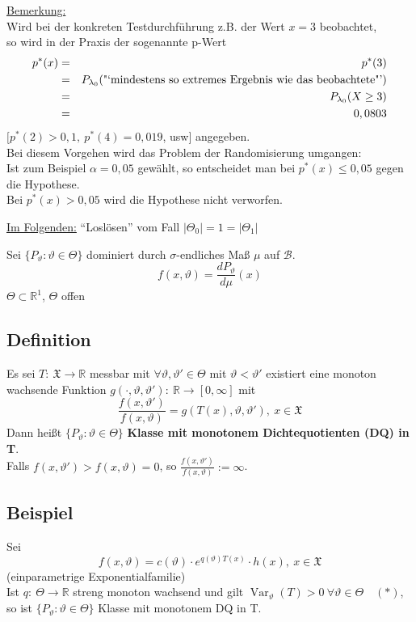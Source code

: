\documentclass[a4paper,11pt,twoside,titlepage]{article}
\newcommand{\R}{{\mathbb R}}
\newcommand{\XX}{{\mathfrak X}} %
\newcommand\BB{ \mathcal{B} } %
\DeclareMathOperator{\var}{Var}
\begin{document}
\underline{Bemerkung:}\\
Wird bei der konkreten Testdurchführung z.B. der Wert $x=3$ beobachtet,\\
so wird in der Praxis der sogenannte p-Wert
\begin{eqnarray*} p^\ast(x)&=&p^\ast(3)\\&=&P_{\lambda_0}(\textnormal{"`mindestens so extremes Ergebnis wie das beobachtete"'})\\&=&P_{\lambda_0}(X\geq 3)\\&=&0,0803\end{eqnarray*}
$[p^\ast(2)>0,1,\ p^\ast(4)=0,019 $, usw$]$ angegeben.\\
Bei diesem Vorgehen wird das Problem der Randomisierung umgangen:\\
Ist zum Beispiel $\alpha=0,05$ gewählt, so entscheidet man bei $p^\ast(x)\leq0,05$ gegen die Hypothese.\\
Bei $p^\ast(x)>0,05$ wird die Hypothese nicht verworfen.

\vspace{1cm}

\underline{Im Folgenden:} "`Loslösen"' vom Fall $|\Theta_0|=1=|\Theta_1|$

Sei $\{P_\vartheta:\vartheta\in\Theta\}$ dominiert durch $\sigma$-endliches Maß $\mu$ auf $\BB$.
\[f(x,\vartheta)=\frac{dP_\vartheta}{d\mu}(x)\]
$\Theta\subset\R^1$, $\Theta$ offen

\subsection{Definition}
Es sei $T:\ \XX\to\R$ messbar mit $\forall\vartheta,\vartheta'\in\Theta$ mit $\vartheta<\vartheta'$ existiert eine monoton wachsende Funktion $g(\cdot,\vartheta,\vartheta'):\ \R\to[0,\infty]$ mit
\[\frac{f(x,\vartheta')}{f(x,\vartheta)}=g(T(x),\vartheta,\vartheta'),\ x\in\XX\]
Dann heißt $\{P_\vartheta:\vartheta\in\Theta\}$ \textbf{Klasse mit monotonem Dichtequotienten (DQ) in T}.\\
Falls $f(x,\vartheta')>f(x,\vartheta)=0$, so $\frac{f(x,\vartheta')}{f(x,\vartheta)}:=\infty$.

\subsection{Beispiel}
Sei 
\[f(x,\vartheta)=c(\vartheta)\cdot e^{q(\vartheta)T(x)}\cdot h(x),\ x\in\XX\]
(einparametrige Exponentialfamilie)\\
Ist $q:\ \Theta\to\R$ streng monoton wachsend und gilt $\var_\vartheta(T)>0\ \forall\vartheta\in\Theta\quad(\ast)$, so ist $\{P_\vartheta:\vartheta\in\Theta\}$ Klasse mit monotonem DQ in T.
\end{document}
